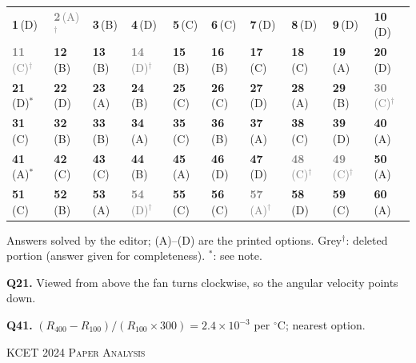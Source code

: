 {\small\setlength{\tabcolsep}{1pt}\renewcommand{\arraystretch}{1.5}
\begin{tabularx}{\linewidth}{@{}*{10}{>{\centering\arraybackslash}X}@{}}\toprule
\textbf{1}\,(D) & \textcolor{gray}{\textbf{2}\,(A)$^{\dagger}$} & \textbf{3}\,(B) & \textbf{4}\,(D) & \textbf{5}\,(C) & \textbf{6}\,(C) & \textbf{7}\,(D) & \textbf{8}\,(D) & \textbf{9}\,(D) & \textbf{10}\,(D)\\
\textcolor{gray}{\textbf{11}\,(C)$^{\dagger}$} & \textbf{12}\,(B) & \textbf{13}\,(B) & \textcolor{gray}{\textbf{14}\,(D)$^{\dagger}$} & \textbf{15}\,(B) & \textbf{16}\,(B) & \textbf{17}\,(C) & \textbf{18}\,(C) & \textbf{19}\,(A) & \textbf{20}\,(D)\\
\textbf{21}\,(D)$^{*}$ & \textbf{22}\,(D) & \textbf{23}\,(A) & \textbf{24}\,(B) & \textbf{25}\,(C) & \textbf{26}\,(C) & \textbf{27}\,(D) & \textbf{28}\,(A) & \textbf{29}\,(B) & \textcolor{gray}{\textbf{30}\,(C)$^{\dagger}$}\\
\textbf{31}\,(C) & \textbf{32}\,(B) & \textbf{33}\,(B) & \textbf{34}\,(A) & \textbf{35}\,(C) & \textbf{36}\,(B) & \textbf{37}\,(A) & \textbf{38}\,(C) & \textbf{39}\,(D) & \textbf{40}\,(A)\\
\textbf{41}\,(A)$^{*}$ & \textbf{42}\,(C) & \textbf{43}\,(C) & \textbf{44}\,(B) & \textbf{45}\,(A) & \textbf{46}\,(D) & \textbf{47}\,(D) & \textcolor{gray}{\textbf{48}\,(C)$^{\dagger}$} & \textcolor{gray}{\textbf{49}\,(C)$^{\dagger}$} & \textbf{50}\,(A)\\
\textbf{51}\,(C) & \textbf{52}\,(B) & \textbf{53}\,(A) & \textcolor{gray}{\textbf{54}\,(D)$^{\dagger}$} & \textbf{55}\,(C) & \textbf{56}\,(C) & \textcolor{gray}{\textbf{57}\,(A)$^{\dagger}$} & \textbf{58}\,(D) & \textbf{59}\,(C) & \textbf{60}\,(A)\\\bottomrule\end{tabularx}}\par\smallskip
{\footnotesize Answers solved by the editor; (A)--(D) are the printed options. {\color{gray}Grey$^{\dagger}$}: deleted portion (answer given for completeness). $^{*}$: see note.\par
\par\smallskip\textbf{Q21.} Viewed from above the fan turns clockwise, so the angular velocity points down.
\par\smallskip\textbf{Q41.} $(R_{400}-R_{100})/(R_{100}\times300) = 2.4\times10^{-3}$ per $^\circ$C; nearest option.
}\par
\clearpage
\begin{center}{}\par
{\fontsize{20}{24}\selectfont\color{navy}\scshape KCET 2024 \textperiodcentered{} Paper Analysis}\par
{\color{gilt}}\end{center}
